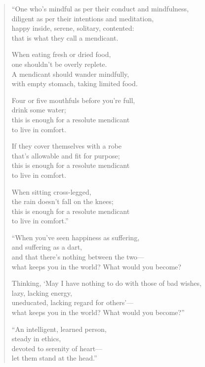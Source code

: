 \documentclass[12pt,openany]{book}%
\begin{document}
\begin{verse}%
“One who’s mindful as per their conduct and mindfulness, \\
diligent as per their intentions and meditation, \\
happy inside, serene, solitary, contented: \\
that is what they call a mendicant. 

When eating fresh or dried food, \\
one shouldn’t be overly replete. \\
A mendicant should wander mindfully, \\
with empty stomach, taking limited food. 

Four or five mouthfuls before you’re full, \\
drink some water; \\
this is enough for a resolute mendicant \\
to live in comfort. 

If they cover themselves with a robe \\
that’s allowable and fit for purpose; \\
this is enough for a resolute mendicant \\
to live in comfort. 

When sitting cross-legged, \\
the rain doesn’t fall on the knees; \\
this is enough for a resolute mendicant \\
to live in comfort.” 

“When you’ve seen happiness as suffering, \\
and suffering as a dart, \\
and that there’s nothing between the two—\\
what keeps you in the world? What would you become? 

Thinking, ‘May I have nothing to do with those of bad wishes, \\
lazy, lacking energy, \\
uneducated, lacking regard for others’—\\
what keeps you in the world? What would you become?” 

“An intelligent, learned person, \\
steady in ethics, \\
devoted to serenity of heart—\\
let them stand at the head.” 


\end{verse}
\end{document}
